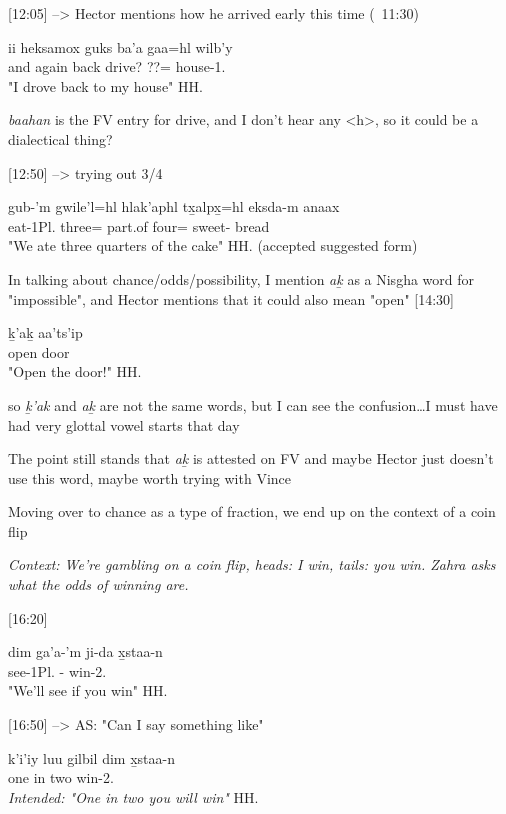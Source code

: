 [12:05] --> Hector mentions how he arrived early this time (~11:30)
\begin{exe}
\ex \gll 
ii heksamox guks ba'a gaa=hl wilb'y\\
and again back drive? ??=\Cn{} house-1.\Ii{}\\
\glt "I drove back to my house" \hfill HH.\ElicitationDate{}
\end{exe}

\textit{baahan} is the FV entry for drive, and I don't hear any <h>, so it could be a dialectical thing?

[12:50] --> trying out 3/4
\begin{exe}
\ex \gll 
gub-'m gwile'l=hl hlak'aphl tx̱alpx̱=hl eksda-m anaax \\
eat-1Pl.\Ii{} three=\Cn{} part.of four=\Cn{} sweet-\Attr{} bread\\
\glt "We ate three quarters of the cake" \hfill HH.\ElicitationDate{} (accepted suggested form)
\end{exe}

In talking about chance/odds/possibility, I mention \textit{aḵ} as a Nisgha word for "impossible", and Hector mentions that it could also mean "open"
[14:30]
\begin{exe}
\ex \gll 
ḵ'aḵ aa'ts'ip\\
open door\\
\glt "Open the door!" \hfill HH.\ElicitationDate{}
\end{exe}

so \textit{ḵ'ak} and \textit{aḵ} are not the same words, but I can see the confusion\dots I must have had very glottal vowel starts that day

The point still stands that \textit{aḵ} is attested on FV and maybe Hector just doesn't use this word, maybe worth trying with Vince

Moving over to chance as a type of fraction, we end up on the context of a coin flip

\textit{Context: We're gambling on a coin flip, heads: I win, tails: you win. Zahra asks what the odds of winning are.}

[16:20]
\begin{exe}
\ex \gll
dim ga'a-'m ji-da x̱staa-n \\
\Fut{} see-1Pl.\Ii{} \Irr{}-\Spt{} win-2.\Ii{}\\
\glt "We'll see if you win" \hfill HH.\ElicitationDate{}
\end{exe}

[16:50] --> AS: "Can I say something like"
\begin{exe}
\ex \gll
k'i'iy luu gilbil dim x̱staa-n \\
one in two \Fut{} win-2.\Ii{}\\
\textit{Intended: "One in two you will win"} \hfill HH.\ElicitationDate{}
\end{exe}


